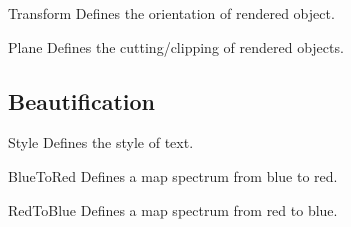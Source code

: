 \begin{classdesc}{Transform}{}
Defines the orientation of rendered object.
\end{classdesc}

\begin{classdesc}{Plane}{}
Defines the cutting/clipping of rendered objects.
\end{classdesc}


\subsection{Beautification}
\begin{classdesc}{Style}{}
Defines the style of text.
\end{classdesc}

\begin{classdesc}{BlueToRed}{}
 Defines a map spectrum from blue to red.
\end{classdesc}

\begin{classdesc}{RedToBlue}{}
 Defines a map spectrum from red to blue.
\end{classdesc}


